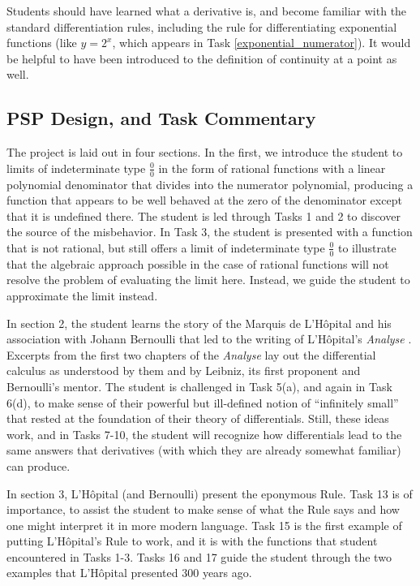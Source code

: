 \message{ !name(LHopitalsRule_2021.03.29.tex)}\documentclass[11pt]{article}
\begin{document}
Students should have learned what a derivative is, and become familiar with the standard differentiation rules, including the rule for differentiating exponential functions (like $y=2^x$, which appears in Task \ref{exponential_numerator}). It would be helpful to have been introduced to the definition of continuity at a point as well. 

  \vspace*{-3pt}


  \vspace*{-6pt}
\subsection*{PSP Design, and Task Commentary}
  \vspace*{-3pt}
The project is laid out in four sections. In the first, we introduce the student to limits of indeterminate type $\frac00$ in the form of rational functions with a linear polynomial denominator that divides into the numerator polynomial, producing a function that appears to be well behaved at the zero of the denominator except that it is undefined there. The student is led through Tasks 1 and 2 to discover the source of the misbehavior. In Task 3, the student is presented with a function that is not rational, but still offers a limit of indeterminate type $\frac00$ to illustrate that the algebraic approach possible in the case of rational functions will not resolve the problem of evaluating the limit here. Instead, we guide the student to approximate the limit instead.

In section 2, the student learns the story of the Marquis de L'H\^opital and his association with Johann Bernoulli that led to the writing of L'H\^opital's \emph{Analyse} \citep{LHopital}. Excerpts from the first two chapters of the \emph{Analyse} lay out the differential calculus as understood by them and by Leibniz, its first proponent and Bernoulli's mentor. The student is challenged in Task 5(a), and again in Task 6(d), to make sense of their powerful but ill-defined notion of ``infinitely small'' that rested at the foundation of their theory of differentials. Still, these ideas work, and in Tasks 7-10, the student will recognize how differentials lead to the same answers that derivatives (with which they are already somewhat familiar) can produce.

In section 3, L'H\^opital (and Bernoulli) present the eponymous Rule. Task 13 is of importance, to assist the student to make sense of what the Rule says and how one might interpret it in more modern language. Task 15 is the first example of putting L'H\^opital's Rule to work, and it is with the functions that student encountered  in Tasks 1-3. Tasks 16 and 17 guide the student through the two examples that L'H\^opital presented 300 years ago.
\end{document}
